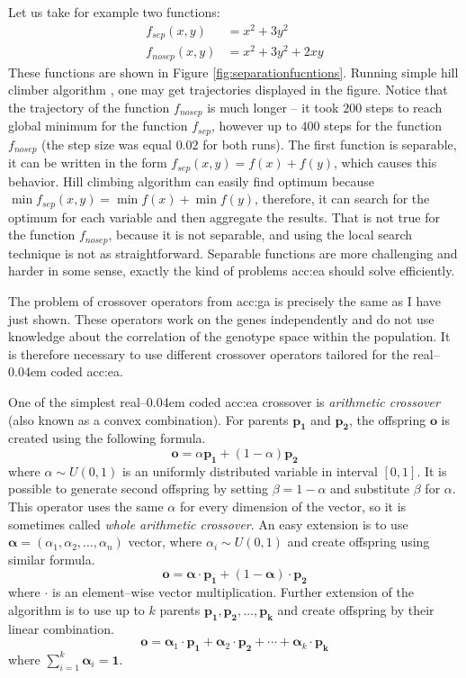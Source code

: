 Let us take for example two functions:
\begin{align*}
    f_{sep}(x,y)&=x^2+3y^2 \\
    f_{nosep}(x,y)&=x^2+3y^2+2xy
\end{align*}
These functions are shown in Figure \ref{fig:separationfucntions}. Running simple hill climber algorithm \citep{HandbookOfMetaheuristics}, one may get trajectories displayed in the figure. Notice that the trajectory of the function $f_{nosep}$ is much longer -- it took $200$ steps to reach global minimum for the function $f_{sep}$, however up to $400$ steps for the function $f_{nosep}$ (the step size was equal $0.02$ for both runs). The first function is separable, it can be written in the form $f_{sep}(x,y)=f(x)+f(y)$, which causes this behavior. Hill climbing algorithm can easily find optimum because $\min f_{sep}(x,y)=\min f(x)+\min f(y)$, therefore, it can search for the optimum for each variable and then aggregate the results. That is not true for the function $f_{nosep}$, because it is not separable, and using the local search technique is not as straightforward. Separable functions are more challenging and harder in some sense, exactly the kind of problems \acrshort{acc:ea} should solve efficiently.

The problem of crossover operators from \acrshort{acc:ga} is precisely the same as I have just shown. These operators work on the genes independently and do not use knowledge about the correlation of the genotype space within the population. It is therefore necessary to use different crossover operators tailored for the real--\kern0.04em coded \acrshort{acc:ea}.

One of the simplest real--\kern0.04em coded \acrshort{acc:ea} crossover is \emph{arithmetic crossover} (also known as a convex combination). For parents $\mathbf{p_1}$ and $\mathbf{p_2}$, the offspring $\mathbf{o}$ is created using the following formula.
$$
\mathbf{o} = \alpha\mathbf{p_1}+\left(1-\alpha\right)\mathbf{p_2}
$$
where $\alpha \sim U(0,1)$ is an uniformly distributed variable in interval $\left[0,1\right]$. It is possible to generate second offspring by setting $\beta=1-\alpha$ and substitute $\beta$ for $\alpha$. This operator uses the same $\alpha$ for every dimension of the vector, so it is sometimes called \emph{whole arithmetic crossover}. An easy extension is to use $\boldsymbol{\alpha}=(\alpha_1,\alpha_2,\dots,\alpha_n)$ vector, where $\alpha_i\sim U(0,1)$ and create offspring using similar formula.
$$
\mathbf{o} = \boldsymbol{\alpha}\cdot\mathbf{p_1}+\left(1-\boldsymbol{\alpha}\right)\cdot\mathbf{p_2}
$$
where $\cdot$ is an element--wise vector multiplication.
Further extension of the algorithm is to use up to $k$ parents $\mathbf{p_1}, \mathbf{p_2},\dots,\mathbf{p_k}$ and create offspring by their linear combination.
$$
\mathbf{o} = 
\boldsymbol{\alpha}_1\cdot\mathbf{p_1}+
\boldsymbol{\alpha}_2\cdot\mathbf{p_2}+
\cdots +
\boldsymbol{\alpha}_k\cdot\mathbf{p_k}
$$
where $\sum_{i=1}^{k}\boldsymbol{\alpha}_i=\boldsymbol{1}$.

